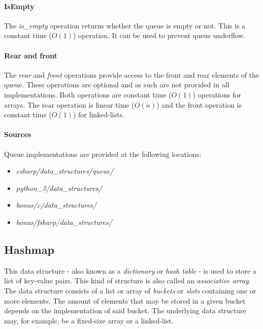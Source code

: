 \documentclass{article}
\begin{document}
\paragraph{IsEmpty}
The {\em is\_empty} operation returns whether the queue is empty or not.
This is a constant time (\(O(1)\)) operation. It can be used to prevent queue underflow.

\paragraph{Rear and front}
The {\em rear} and {\em front} operations provide access to the front and rear elements of the queue.
These operations are optional and as such are not provided in all implementations. Both operations are
constant time (\(O(1)\)) operations for arrays. The rear operation is linear time (\(O(n)\)) and the
front operation is constant time (\(O(1)\)) for linked-lists.

\begin{samepage}
  \paragraph{Sources}
  Queue implementations are provided at the following locations:
  \begin{itemize}
  \item{{\em csharp/data\_structures/queue/}}
  \item{{\em python\_3/data\_structures/}}
  \item{{\em bonus/c/data\_structures/}}
  \item{{\em bonus/fsharp/data\_structures/}}
  \end{itemize}
\end{samepage}




\subsection{Hashmap}
This data structure - also known as a {\em dictionary} or {\em hash table} - is used to store a list of
key-value pairs. This kind of structure is also called an {\em associative array}. The data structure
consists of a list or array of {\em buckets} or {\em slots} containing one or more elements. The amount
of elements that may be stored in a given bucket depends on the implementation of said bucket.
The underlying data structure may, for example, be a fixed-size array or a linked-list.
\end{document}
